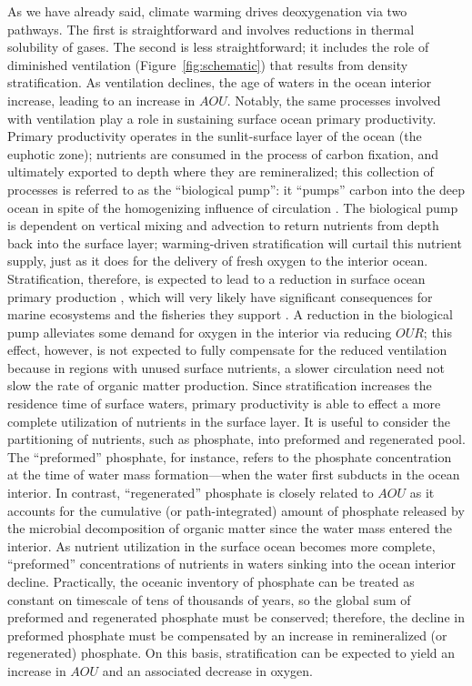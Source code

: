\documentclass{report_chapter}
\begin{document}
As we have already said, climate warming drives deoxygenation via two pathways.
The first is straightforward and involves reductions in thermal solubility of gases.
The second is less straightforward; it includes the role of diminished ventilation (Figure~\ref{fig:schematic}) that results from density stratification.
As ventilation declines, the age of waters in the ocean interior increase, leading to an increase in $AOU$.
Notably, the same processes involved with ventilation play a role in sustaining surface ocean primary productivity.
Primary productivity operates in the sunlit-surface layer of the ocean (the euphotic zone); nutrients are consumed in the process of carbon fixation, and ultimately exported to depth where they are remineralized; this collection of processes is referred to as the ``biological pump'': it ``pumps'' carbon into the deep ocean in spite of the homogenizing influence of circulation \citep{Volk-Hoffert-1985}.
The biological pump is dependent on vertical mixing and advection to return nutrients from depth back into the surface layer; warming-driven stratification will curtail this nutrient supply, just as it does for the delivery of fresh oxygen to the interior ocean.
Stratification, therefore, is expected to lead to a reduction in surface ocean primary production \citep{Steinacher-Joos-etal-2010,Bopp-Resplandy-etal-2013}, which will very likely have significant consequences for marine ecosystems and the fisheries they support \citep{Stock-John-etal-2017}.
A reduction in the biological pump alleviates some demand for oxygen in the interior via reducing $OUR$; this effect, however, is not expected to fully compensate for the reduced ventilation because in regions with unused surface nutrients, a slower circulation need not slow the rate of organic matter production.
Since stratification increases the residence time of surface waters, primary productivity is able to effect a more complete utilization of nutrients in the surface layer.
It is useful to consider the partitioning of nutrients, such as phosphate, into preformed and regenerated pool.
The ``preformed'' phosphate, for instance, refers to the phosphate concentration at the time of water mass formation---when the water first subducts in the ocean interior.
In contrast, ``regenerated'' phosphate is closely related to $AOU$ as it accounts for the cumulative (or path-integrated) amount of phosphate released by the microbial decomposition of organic matter since the water mass entered the interior.
As nutrient utilization in the surface ocean becomes more complete, ``preformed'' concentrations of nutrients in waters sinking into the ocean interior decline.
Practically, the oceanic inventory of phosphate can be treated as constant on timescale of tens of thousands of years, so the global sum of preformed and regenerated phosphate must be conserved; therefore, the decline in preformed phosphate must be compensated by an increase in remineralized (or regenerated) phosphate.
On this basis, stratification can be expected to yield an increase in $AOU$ and an associated decrease in oxygen.
\end{document}
